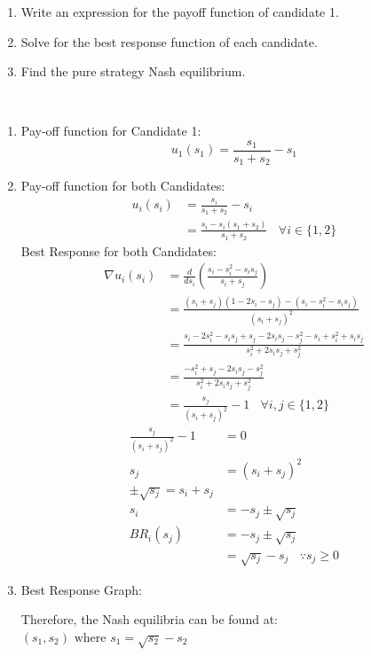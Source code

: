\documentclass[12pt]{article}
\newenvironment{solution}[2][Solution]{\begin{trivlist}
\item[\hskip \labelsep {\bfseries #1}]}{\end{trivlist}}
\begin{document}
\begin{enumerate}[label=\alph*)]
\item Write an expression for the payoff function of candidate 1.
\item Solve for the best response function of each candidate.
\item Find the pure strategy Nash equilibrium.
\end{enumerate}

\begin{solution}{}~\\
\begin{enumerate}[label=\alph*)]
\item Pay-off function for Candidate 1:\\

$$u_1(s_1)=\frac{s_1}{s_1+s_2}-s_1$$
\item Pay-off function for both Candidates:\\
\begin{align*}
u_i(s_i)&=\frac{s_i}{s_1+s_2}-s_i\\
&=\frac{s_i-s_i(s_1+s_2)}{s_1+s_2}\ \ \ \ \forall i \in\{1,2\}
\end{align*}
Best Response for both Candidates:\\
\begin{align*}
\nabla u_i(s_i)&=\frac{d}{ds_i}\left(\frac{s_i-s_i^2-s_is_j}{s_i+s_j}\right)\\
&=\frac{(s_i+s_j)(1-2s_i-s_j)-(s_i-s_i^2-s_is_j)}{(s_i+s_j)^2}\\
&=\frac{s_i-2s_i^2-s_is_j+s_j-2s_is_j-s_j^2-s_i+s_i^2+s_is_j}{s_i^2+2s_is_j+s_j^2}\\
&=\frac{-s_i^2+s_j-2s_is_j-s_j^2}{s_i^2+2s_is_j+s_j^2}\\
&=\frac{s_j}{(s_i+s_j)^2}-1\ \ \ \ \forall i,j \in\{1,2\}
\end{align*}
\begin{align*}
\frac{s_j}{(s_i+s_j)^2}-1&=0\\
s_j&=(s_i+s_j)^2\\
\pm\sqrt{s_j}=s_i+s_j\\
s_i&=-s_j\pm\sqrt{s_j}\\
BR_i(s_j)&=-s_j\pm\sqrt{s_j}\\
&=\sqrt{s_j}-s_j\ \ \ \ \because s_j\geq0
\end{align*}

\item Best Response Graph:\\


Therefore, the Nash equilibria can be found at:\\

$(s_1,s_2)\text{  where }s_1=\sqrt{s_2}-s_2$

\end{enumerate}
\end{solution}
\end{document}
